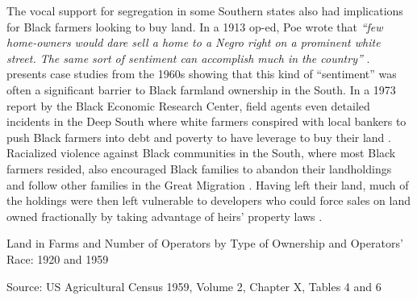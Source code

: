 \documentclass[12pt]{article}
\begin{document}
The vocal support for segregation in some Southern states also had implications for Black farmers looking to buy land.
In a 1913 op-ed, Poe wrote that \textit{``few home-owners would dare sell a home to a Negro right on a prominent white street. The same sort of sentiment can accomplish much in the country''} \citep[pg. 845]{poe_south-wide_1913}.
\citet{brown_successful_1977} presents case studies from the 1960s showing that this kind of ``sentiment'' was often a significant barrier to Black farmland ownership in the South. In a 1973 report by the Black Economic Research Center, field agents even detailed incidents in the Deep South where white farmers conspired with local bankers to push Black farmers into debt and poverty to have leverage to buy their land \citep{black_economic_research_center_center_only_1973}. Racialized violence against Black communities in the South, where most Black farmers resided, also encouraged Black families to abandon their landholdings and follow other families in the Great Migration \citep{daniel_dispossession_2013,wilkerson_long-lasting_2016}.
Having left their land, much of the holdings were then left vulnerable to developers who could force sales on land owned fractionally by taking advantage of heirs’ property laws \citep{mitchell_reconstruction_2000}.

\begin{table}
\caption{Land in Farms and Number of Operators by Type of Ownership and
Operators’ Race: 1920 and 1959}
\label{operator_acrage}
\centering
\footnotesize

Source: US Agricultural Census 1959, Volume 2, Chapter X, Tables 4 and 6
\end{table}
\end{document}
